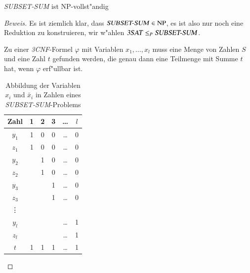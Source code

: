 \begin{satz}\textsl{SUBSET-SUM} ist NP-vollst"andig
\end{satz}

\begin{proof}[Beweis]
Es ist ziemlich klar, dass $\text{\textsl{SUBSET-SUM}}\in\operatorname{NP}$,
es ist also nur noch eine Reduktion zu konstruieren, wir w"ahlen
$\text{\textsl{3SAT}}\le_P\text{\textsl{SUBSET-SUM}}$.

Zu einer \textsl{3CNF}-Formel $\varphi$ mit Variablen $x_1,\dots,x_l$
muss eine Menge von Zahlen $S$ und eine Zahl $t$ gefunden werden,
die genau dann eine Teilmenge mit Summe $t$ hat, wenn $\varphi$
erf"ullbar ist.

\begin{table}
\begin{center}
\begin{tabular}{|c|ccccc|}
\hline
Zahl&1&2&3&\dots&$l$\\
\hline
$y_1$&1&0&0&\dots&0\\
$z_1$&1&0&0&\dots&0\\
$y_2$& &1&0&\dots&0\\
$z_2$& &1&0&\dots&0\\
$y_3$& & &1&\dots&0\\
$z_3$& & &1&\dots&0\\
\vdots&& & &     & \\
$y_l$& & & &\dots&1\\
$z_l$& & & &\dots&1\\
\hline
$t$&1&1&1&\dots&1\\
\hline
\end{tabular}
\end{center}
\caption{Abbildung der Variablen $x_i$ und $\bar x_i$ in Zahlen
eines \textsl{SUBSET-SUM}-Problems\label{subsetsumnumbers}}
\end{table}


\end{proof}

